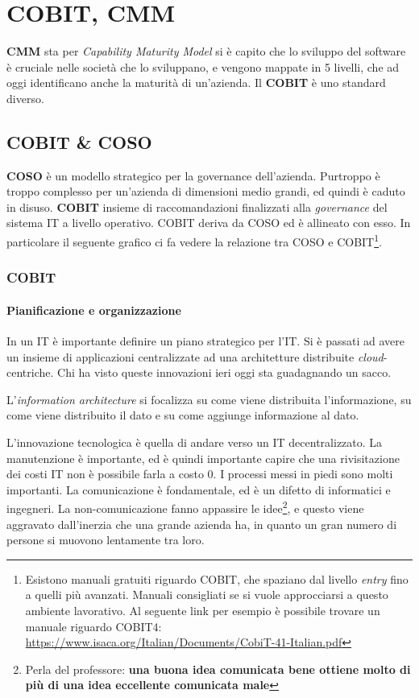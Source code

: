 \chapter{COBIT, CMM}

\textbf{CMM} sta per \textit{Capability Maturity Model} si è capito che lo 
sviluppo del software è cruciale nelle società che lo sviluppano, e vengono 
mappate in 5 livelli, che ad oggi identificano anche la maturità di un'azienda. 
Il \textbf{COBIT} è uno standard diverso.

\section{COBIT \& COSO}

\textbf{COSO} è un modello strategico per la governance dell'azienda. Purtroppo 
è troppo complesso per un'azienda di dimensioni medio grandi, ed quindi è caduto 
in disuso.
\textbf{COBIT} insieme di raccomandazioni finalizzati alla \textit{governance} 
del sistema IT a livello operativo.
COBIT deriva da COSO ed è allineato con esso. In particolare il seguente grafico 
ci fa vedere la relazione tra COSO e COBIT\footnote{Esistono manuali gratuiti 
riguardo COBIT, che spaziano dal livello \textit{entry} fino a quelli più 
avanzati. Manuali consigliati se si vuole approcciarsi a questo ambiente 
lavorativo. Al seguente link per esempio è possibile trovare un manuale riguardo 
COBIT4:  \url{https://www.isaca.org/Italian/Documents/CobiT-41-Italian.pdf}}.

\subsection{COBIT}

\subsubsection{Pianificazione e organizzazione}

In un IT è importante definire un piano strategico per l'IT. Si è passati ad 
avere un insieme di applicazioni centralizzate ad una architetture distribuite 
\textit{cloud}-centriche. Chi ha visto queste innovazioni ieri oggi sta 
guadagnando un sacco.

L'\textit{information architecture} si focalizza su come viene distribuita 
l'informazione, su come viene distribuito il dato e su come aggiunge 
informazione al dato.

L'innovazione tecnologica è quella di andare verso un IT decentralizzato. La 
manutenzione è importante, ed è quindi importante capire che una rivisitazione 
dei costi IT non è possibile farla a costo 0. I processi messi in piedi sono 
molti importanti. La comunicazione è fondamentale, ed è un difetto di 
informatici e ingegneri. La non-comunicazione fanno appassire le 
idee\footnote{Perla del professore: \textbf{una buona idea comunicata bene 
ottiene molto di più di una idea eccellente comunicata male}}, e questo viene 
aggravato dall'inerzia che una grande azienda ha, in quanto un gran numero di 
persone si muovono lentamente tra loro.

